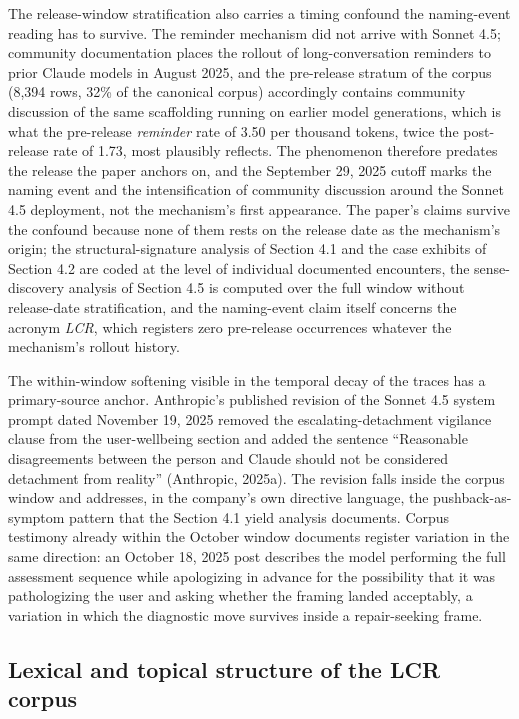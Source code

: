 \documentclass[11pt]{article}
\begin{document}
The release-window stratification also carries a timing confound the naming-event reading has to survive. The reminder mechanism did not arrive with Sonnet 4.5; community documentation places the rollout of long-conversation reminders to prior Claude models in August 2025, and the pre-release stratum of the corpus (8,394 rows, 32\% of the canonical corpus) accordingly contains community discussion of the same scaffolding running on earlier model generations, which is what the pre-release \emph{reminder} rate of 3.50 per thousand tokens, twice the post-release rate of 1.73, most plausibly reflects. The phenomenon therefore predates the release the paper anchors on, and the September 29, 2025 cutoff marks the naming event and the intensification of community discussion around the Sonnet 4.5 deployment, not the mechanism's first appearance. The paper's claims survive the confound because none of them rests on the release date as the mechanism's origin; the structural-signature analysis of Section 4.1 and the case exhibits of Section 4.2 are coded at the level of individual documented encounters, the sense-discovery analysis of Section 4.5 is computed over the full window without release-date stratification, and the naming-event claim itself concerns the acronym \emph{LCR}, which registers zero pre-release occurrences whatever the mechanism's rollout history.

The within-window softening visible in the temporal decay of the traces has a primary-source anchor. Anthropic's published revision of the Sonnet 4.5 system prompt dated November 19, 2025 removed the escalating-detachment vigilance clause from the user-wellbeing section and added the sentence ``Reasonable disagreements between the person and Claude should not be considered detachment from reality'' (Anthropic, 2025a). The revision falls inside the corpus window and addresses, in the company's own directive language, the pushback-as-symptom pattern that the Section 4.1 yield analysis documents. Corpus testimony already within the October window documents register variation in the same direction: an October 18, 2025 post describes the model performing the full assessment sequence while apologizing in advance for the possibility that it was pathologizing the user and asking whether the framing landed acceptably, a variation in which the diagnostic move survives inside a repair-seeking frame.

\subsection{Lexical and topical structure of the LCR corpus}
\end{document}
